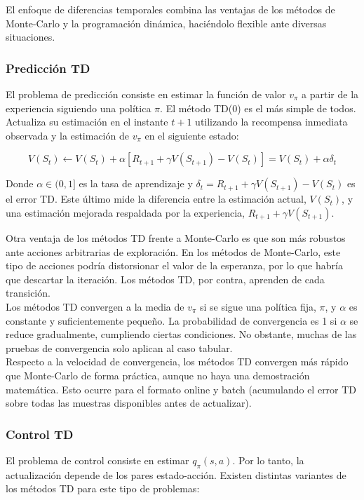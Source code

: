 \documentclass[11pt,a4paper]{article}
\begin{document}
		El enfoque de diferencias temporales combina las ventajas de los métodos de Monte-Carlo y la programación dinámica, haciéndolo flexible ante diversas situaciones.
		
		\subsubsection{Predicción TD}
		El problema de predicción consiste en estimar la función de valor $v_\pi$ a partir de la experiencia siguiendo una política $\pi$. El método TD(0) es el más simple de todos. Actualiza su estimación en el instante $t+1$ utilizando la recompensa inmediata observada y la estimación de $v_\pi$ en el siguiente estado:
		
		\begin{equation}
		V(S_t) \leftarrow V(S_t) + \alpha \left[ R_{t+1} + \gamma V(S_{t+1}) - V(S_t) \right] = V(S_t) + \alpha \delta_t
		\end{equation}
		
		Donde $\alpha \in (0, 1]$ es la tasa de aprendizaje y $\delta_t = R_{t+1} + \gamma V(S_{t+1}) - V(S_t)$ es el error TD. Este último mide la diferencia entre la estimación actual, $V(S_t)$, y una estimación mejorada respaldada por la experiencia, $R_{t+1} + \gamma V(S_{t+1})$.
		
		Otra ventaja de los métodos TD frente a Monte-Carlo es que son más robustos ante acciones arbitrarias de exploración. En los métodos de Monte-Carlo, este tipo de acciones podría distorsionar el valor de la esperanza, por lo que habría que descartar la iteración. Los métodos TD, por contra, aprenden de cada transición. \\
		
		Los métodos TD convergen a la media de $v_\pi$ si se sigue una política fija, $\pi$, y $\alpha$ es constante y suficientemente pequeño. La probabilidad de convergencia es 1 si $\alpha$ se reduce gradualmente, cumpliendo ciertas condiciones. No obstante, muchas de las pruebas de convergencia solo aplican al caso tabular.\\
		
		Respecto a la velocidad de convergencia, los métodos TD convergen más rápido que Monte-Carlo de forma práctica, aunque no haya una demostración matemática. Esto ocurre para el formato online y batch (acumulando el error TD sobre todas las muestras disponibles antes de actualizar).
		
		\subsubsection{Control TD}
		El problema de control consiste en estimar $q_\pi(s,a)$. Por lo tanto, la actualización depende de los pares estado-acción. Existen distintas variantes de los métodos TD para este tipo de problemas:
		
\end{document}
